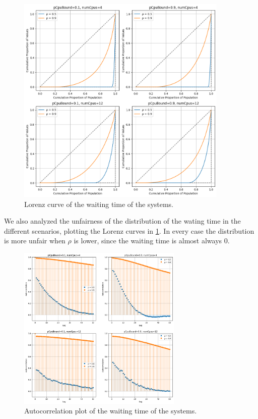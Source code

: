 \begin{figure}[H]
    \captionsetup{type=figure}
    \centering
    \includegraphics[width=0.9\textwidth]{./images/04/fcfs/wait/lorenz.png}
    \caption{Lorenz curve of the waiting time of the systems.}
    \label{fig:fcfsWaitLorenz}
\end{figure}

We also analyzed the unfairness of the distribution of the wating time in the 
different scenarios, plotting the Lorenz curves in \cref{fig:fcfsWaitLorenz}.
In every case the distribution is more unfair when $\rho$ is lower, since the
waiting time is almost always $0$. 

\begin{figure}[H]
    \captionsetup{type=figure}
    \centering
    \includegraphics[width=0.7\textwidth]{./images/04/fcfs/wait/autocorrelation.png}
    \caption{Autocorrelation plot of the waiting time of the systems.}
    \label{fig:fcfsWaitAutocorrelation}
\end{figure}

